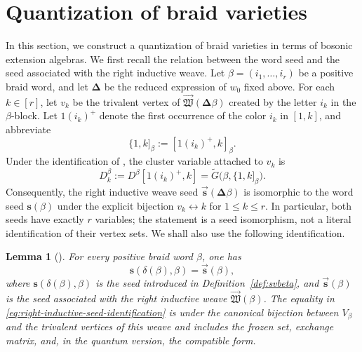 \documentclass[12pt, reqno]{amsart}
\theoremstyle{plain}
\newtheorem{lemma}[theorem]{Lemma}
\theoremstyle{definition}
\numberwithin{equation}{section}
\begin{document}
\section{Quantization of braid varieties}\label{sec:quantization-braid-varieties}
In this section, we construct a quantization of braid varieties in terms of bosonic extension algebras. 
We first recall the relation between the word seed and the seed
associated with the right inductive weave. Let
\(\beta=(i_1,\ldots,i_r)\) be a positive braid word, and let
\(\boldsymbol{\Delta}\) be the reduced expression of \(w_0\) fixed
above. For each \(k\in[r]\), let \(v_k\) be the trivalent vertex of
\(
    \overrightarrow{\mathfrak W}
    (\boldsymbol{\Delta}\beta)
\)
created by the letter \(i_k\) in the \(\beta\)-block. Let
\(1(i_k)^+\) denote the first occurrence of the color \(i_k\) in
\([1,k]\), and abbreviate
\begin{equation}\label{eq:initial-beta-box}
    \{1,k]_\beta
    :=
    [1(i_k)^+,k]_\beta.
\end{equation}
Under the identification of
\cite{kashiwara2025monoidal,casals2025cluster}, the cluster variable
attached to \(v_k\) is
\begin{equation}\label{eq:right-weave-variable-initial-minor}
    D_k^\beta
    :=
    D^\beta[1(i_k)^+,k]
    =
    \widetilde G\bigl(\beta,\{1,k]_\beta\bigr).
\end{equation}
Consequently, the right inductive weave seed
\(\overrightarrow{\mathbf s}
(\boldsymbol{\Delta}\beta)\) is isomorphic to the word seed
\(\mathbf s(\beta)\) under the explicit bijection
\(v_k\leftrightarrow k\) for \(1\leq k\leq r\). In particular,
both seeds have exactly \(r\) variables; the statement is a seed
isomorphism, not a literal identification of their vertex sets.
We shall also use the following identification.

\begin{lemma}[{\cite[Theorem~3.12]{bi2026towards}}]
\label{lem:right-inductive-seed-restriction}
For every positive braid word \(\beta\), one has
\begin{equation}\label{eq:right-inductive-seed-identification}
    \mathbf s(\delta(\beta),\beta)
    =
    \overrightarrow{\mathbf s}(\beta),
\end{equation}
where \(\mathbf s(\delta(\beta),\beta)\) is the seed introduced in
Definition~\ref{def:svbeta}, and
\(\overrightarrow{\mathbf s}(\beta)\) is the seed associated with
the right inductive weave
\(\overrightarrow{\mathfrak W}(\beta)\).
The equality in \eqref{eq:right-inductive-seed-identification} is
under the canonical bijection between \(V_\beta\) and the trivalent
vertices of this weave and includes the frozen set, exchange matrix,
and, in the quantum version, the compatible form.
\end{lemma}
\end{document}
